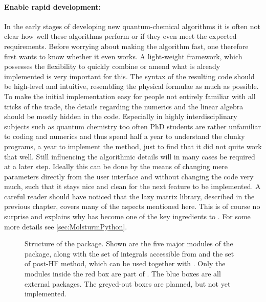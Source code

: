 \paragraph{Enable rapid development:}
In the early stages of developing new quantum-chemical algorithms
it is often not clear how well these algorithms perform
or if they even meet the expected requirements.
Before worrying about making the algorithm fast,
one therefore first wants to know whether it even works.
A light-weight framework, which possesses the flexibility
to quickly combine or amend what is already implemented is very important for this.
The syntax of the resulting code should be high-level and intuitive,
resembling the physical formulae as much as possible.
To make the initial implementation easy for people
not entirely familiar with all tricks of the trade,
the details regarding the numerics and the linear algebra
should be mostly hidden in the code.
Especially in highly interdisciplinary subjects such as quantum chemistry
too often PhD students are rather unfamiliar to coding and numerics
and thus spend half a year to understand the clunky programs,
a year to implement the method,
just to find that it did not quite work that well.
Still influencing the algorithmic details
will in many cases be required at a later step.
Ideally this can be done by the means of changing mere parameters
directly from the user interface and
without changing the code very much,
such that it stays nice and clean for the next feature to be implemented.
A careful reader should have noticed that the \lazyten lazy matrix library,
described in the previous chapter,
covers many of the aspects mentioned here.
This is of course no surprise and explains why \lazyten has
become one of the key ingredients to \molsturm.
For some more details see \vref{sec:MolsturmPython}.
%
%
\begin{figure}
	\centering
	\caption[Structure of the \molsturm package]
	{Structure of the \molsturm package. Shown are the five major
	modules of the package,
	along with the set of integrals accessible from \gint and the set of post-HF method,
	which can be used together with \molsturm.
	Only the modules inside the red box are part of \molsturm.
	The blue boxes are all external packages.
	The greyed-out boxes are planned, but not yet implemented.
	}
	\label{fig:structureMolsturm}
\end{figure}
